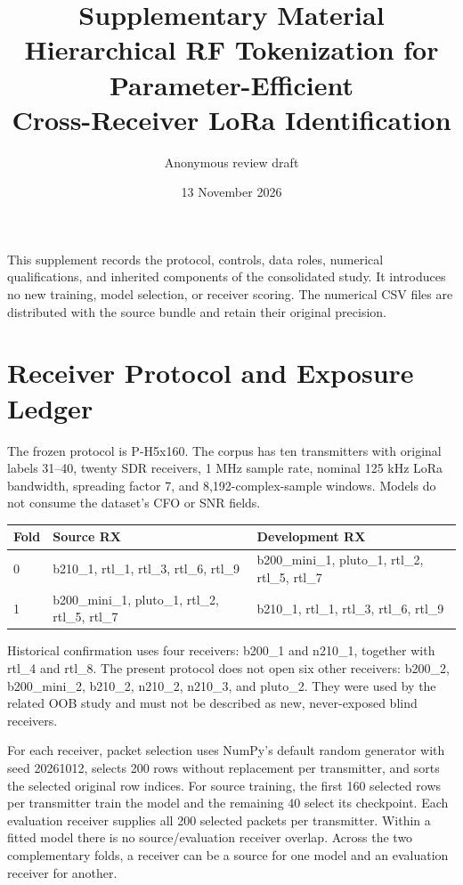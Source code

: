 \documentclass[11pt]{article}
\title{Supplementary Material\\\large Hierarchical RF Tokenization for Parameter-Efficient\\Cross-Receiver LoRa Identification}
\author{Anonymous review draft}\date{13 November 2026}
\begin{document}
\maketitle
\noindent This supplement records the protocol, controls, data roles, numerical qualifications, and inherited components of the consolidated study. It introduces no new training, model selection, or receiver scoring. The numerical CSV files are distributed with the source bundle and retain their original precision.

\section{Receiver Protocol and Exposure Ledger}
The frozen protocol is P-H5x160. The corpus has ten transmitters with original labels 31--40, twenty SDR receivers, 1 MHz sample rate, nominal 125 kHz LoRa bandwidth, spreading factor 7, and 8,192-complex-sample windows. Models do not consume the dataset's CFO or SNR fields.

\begin{table}[htbp]\centering\small
\begin{tabular}{p{2.25cm}p{6.2cm}p{6.2cm}}\toprule
Fold & Source RX & Development RX\\\midrule
0 & b210\_1, rtl\_1, rtl\_3, rtl\_6, rtl\_9 & b200\_mini\_1, pluto\_1, rtl\_2, rtl\_5, rtl\_7\\
1 & b200\_mini\_1, pluto\_1, rtl\_2, rtl\_5, rtl\_7 & b210\_1, rtl\_1, rtl\_3, rtl\_6, rtl\_9\\\bottomrule
\end{tabular}
\end{table}

Historical confirmation uses four receivers: b200\_1 and n210\_1, together with rtl\_4 and rtl\_8. The present protocol does not open six other receivers: b200\_2, b200\_mini\_2, b210\_2, n210\_2, n210\_3, and pluto\_2. They were used by the related OOB study and must not be described as new, never-exposed blind receivers.

For each receiver, packet selection uses NumPy's default random generator with seed 20261012, selects 200 rows without replacement per transmitter, and sorts the selected original row indices. For source training, the first 160 selected rows per transmitter train the model and the remaining 40 select its checkpoint. Each evaluation receiver supplies all 200 selected packets per transmitter. Within a fitted model there is no source/evaluation receiver overlap. Across the two complementary folds, a receiver can be a source for one model and an evaluation receiver for another.
\end{document}
